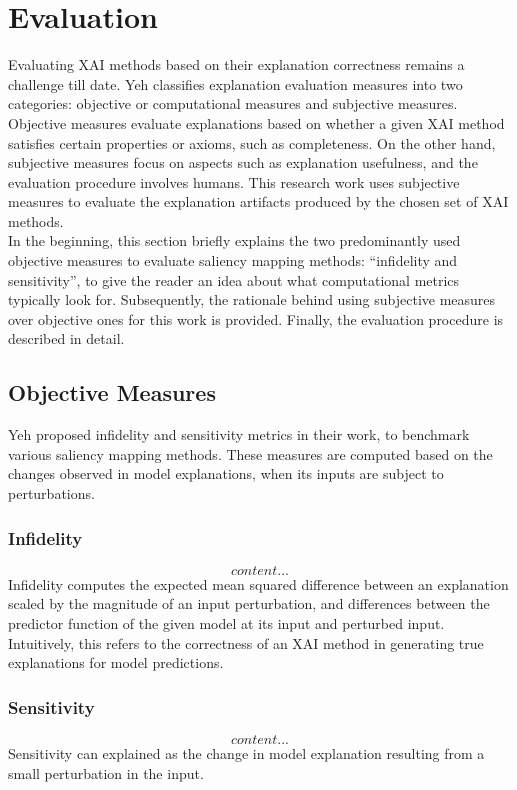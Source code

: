 \documentclass[../report.tex]{subfiles}
\begin{document}
	\section{Evaluation}
	Evaluating XAI methods based on their explanation correctness remains a challenge till date. Yeh \etal \cite{yeh2019fidelity} classifies explanation evaluation measures into two categories: objective or computational measures and subjective measures. Objective measures evaluate explanations based on whether a given XAI method satisfies certain properties or axioms, such as completeness\cite{sundararajan2017axiomatic}. On the other hand, subjective measures focus on aspects such as explanation usefulness, and the evaluation procedure involves humans. This research work uses subjective measures to evaluate the explanation artifacts produced by the chosen set of XAI methods.\\ 
	In the beginning, this section briefly explains the two predominantly used objective measures to evaluate saliency mapping methods: \enquote{infidelity and sensitivity}\cite{yeh2019fidelity}, to give the reader an idea about what computational metrics typically look for. Subsequently, the rationale behind using subjective measures over objective ones for this work is provided. Finally, the evaluation procedure is described in detail.
	\subsection{Objective Measures}
	Yeh \etal \cite{yeh2019fidelity} proposed infidelity and sensitivity metrics in their work, to benchmark various saliency mapping methods. These measures are computed based on the changes observed in model explanations, when its inputs are subject to perturbations. 
	\subsubsection{Infidelity}
	\begin{equation}
		content...
	\end{equation}
	Infidelity computes the expected mean squared difference between an explanation scaled by the magnitude of an input perturbation, and differences between the predictor function of the given model at its input and perturbed input. Intuitively, this refers to the correctness of an XAI method in generating true explanations for model predictions.
	\subsubsection{Sensitivity}
	\begin{equation}
		content...
	\end{equation}
	Sensitivity can explained as the change in model explanation resulting from a small perturbation in the input.
	
\end{document}

